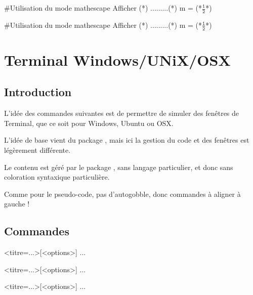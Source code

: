 \documentclass{article}
\newcommand\ctex[1]{\tcbox[vignettelatex]{#1}}
\begin{document}
\begin{codetex}
\begin{envpseudocode}[12cm][]
#Utilisation du mode mathescape
Afficher (*\og*) .........(*\fg*)
m = (*$\tfrac{\texttt{1}}{\texttt{2}}$*)
\end{envpseudocode}
\end{codetex}

\begin{codesortie}
\begin{envpseudocode}[12cm][]
#Utilisation du mode mathescape
Afficher (*\og*) .........(*\fg*)
m = (*$\tfrac{\texttt{1}}{\texttt{2}}$*)
\end{envpseudocode}
\end{codesortie}

\newpage

\section{Terminal Windows/UNiX/OSX}\label{terms}

\subsection{Introduction}

\begin{codeidee}
L'idée des \textsf{commandes} suivantes est de permettre de simuler des fenêtres de \textsf{Terminal}, que ce soit pour Windows, Ubuntu ou OSX.

\smallskip

L'idée de base vient du {package} \ctex{termsim}, mais ici la gestion du \textsf{code} et des \textsf{fenêtres} est légèrement différente.

\smallskip

Le \textsf{contenu} est géré par le package \ctex{listings}, sans langage particulier, et donc sans coloration syntaxique particulière.
\end{codeidee}

\begin{codeattention}
Comme pour le pseudo-code, pas d'\textsf{autogobble}, donc commandes à aligner à gauche !
\end{codeattention}

\subsection{Commandes}

\begin{codetex}
\begin{PLtermwin}[<largeur>]{<titre=...>}[<options>]
...
\end{PLtermwin}

\begin{PLtermunix}[<largeur>]{<titre=...>}[<options>]
...
\end{PLtermunix}

\begin{PLtermosx}[<largeur>]{<titre=...>}[<options>]
...
\end{PLtermosx}
\end{codetex}
\end{document}
